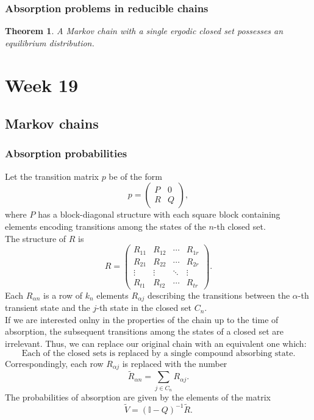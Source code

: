 \documentclass{article}
\newtheorem{theorem}{Theorem}
\begin{document}
 \subsubsection{Absorption problems in reducible chains}
 \begin{theorem}
     A Markov chain with a single ergodic closed set possesses an equilibrium distribution.
 \end{theorem}
 

\section{Week 19}
\subsection{Markov chains}
\subsubsection{Absorption probabilities}
Let the transition matrix $p$ be of the form
\begin{equation}
    p = \begin{pmatrix} P & 0 \\ R & Q \end{pmatrix},\nonumber
\end{equation}
where $P$ has a block-diagonal structure with each square block containing elements encoding transitions among the states of the $n$-th closed set. \\
The structure of $R$ is
\begin{equation}
    R = 
    \begin{pmatrix}
        R_{11} & R_{12} & \cdots & R_{1r} \\
        R_{21} & R_{22} & \cdots & R_{2r} \\
        \vdots & \vdots & \ddots & \vdots \\
        R_{t1} & R_{t2} & \cdots & R_{tr} 
    \end{pmatrix}. \nonumber
\end{equation}
Each $R_{\alpha n}$ is a row of $k_n$ elements $R_{\alpha j}$ describing the transitions between the $\alpha$-th transient state and the $j$-th state in the closed set $C_n$. \\
If we are interested onlny in the properties of the chain up to the time of absorption, the subsequent transitions among the states of a closed set are irrelevant. Thus, we can replace our original chain with an equivalent one which: 
\begin{equation}
    \text{Each of the closed sets is replaced by a single compound absorbing state.}
\end{equation}
Correspondingly, each row $R_{\alpha j}$ is replaced with the number
\begin{equation}
    \tilde{R}_{\alpha n} = \sum_{j\in C_n} R_{\alpha j}.
\end{equation}
The probabilities of absorption are given by the elements of the matrix
\begin{equation}
    \tilde{V} = (\mathbb{I}-Q)^{-1}\tilde{R}.
\end{equation}
\end{document}
